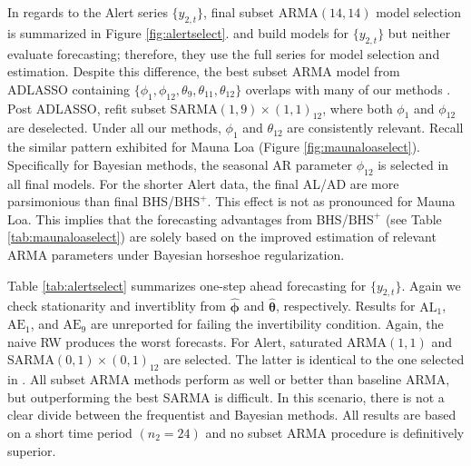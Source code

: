 In regards to the Alert series $\{y_{2,t}\}$, final subset ARMA$(14,14)$ model selection is summarized in Figure \ref{fig:alertselect}. \citet{Cryer2008} and \citet{Chen2011}  build models for $\{y_{2,t}\}$ but neither evaluate forecasting; therefore, they use the full series for model selection and estimation. Despite this difference, the best subset ARMA model from ADLASSO containing $\{\phi_1,\phi_{12},\theta_9,\theta_{11},\theta_{12}\}$ overlaps with many of our methods \citep{Chen2011}. Post ADLASSO, \cite{Chen2011} refit subset SARMA$(1,9)\times(1,1)_{12}$, where both $\phi_1$ and $\phi_{12}$ are deselected. Under all our methods, $\phi_1$ and $\theta_{12}$ are consistently relevant. Recall the similar pattern exhibited for Mauna Loa (Figure \ref{fig:maunaloaselect}). Specifically for Bayesian methods, the seasonal AR parameter $\phi_{12}$ is selected in all final models. For the shorter Alert data, the final AL/AD are more parsimonious than final BHS/$\textrm{BHS}^+$. This effect is not as pronounced for Mauna Loa. This implies that the forecasting advantages from  BHS/$\textrm{BHS}^+$ (see Table \ref{tab:maunaloaselect}) are solely based on the improved estimation of relevant ARMA parameters under Bayesian horseshoe regularization.

Table \ref{tab:alertselect} summarizes one-step ahead forecasting for $\{y_{2,t}\}$. Again we check stationarity and invertiblity from $\hat{\bm{\phi}}$ and $\hat{\bm{\theta}}$, respectively. Results for $\textrm{AL}_1$, $\textrm{AE}_1$, and $\textrm{AE}_9$ are unreported for failing the invertibility condition. Again, the naive RW produces the worst forecasts. For Alert, saturated ARMA$(1,1)$ and SARMA$(0,1)\times(0,1)_{12}$ are selected. The latter is identical to the one selected in \cite{Cryer2008}. All subset ARMA methods perform as well or better than baseline ARMA, but outperforming the best SARMA  is difficult. In this scenario, there is not a clear divide between the frequentist and Bayesian methods. All results are based on a short time period $(n_2=24)$ and no subset ARMA procedure is definitively superior. 

